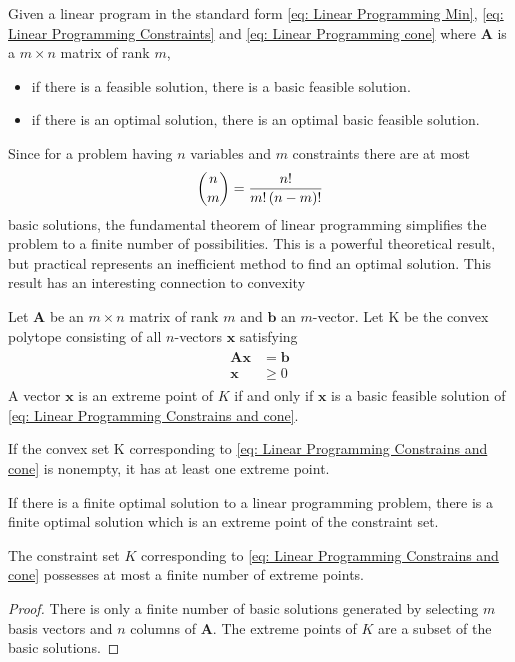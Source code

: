 \begin{theorem} Given a linear program in the standard form \eqref{eq: Linear Programming Min}, \eqref{eq: Linear Programming Constraints} and \eqref{eq: Linear Programming cone} where $\mathbf{A}$ is a $m\times n $ matrix of rank $m$,
	\begin{itemize}
		\item if there is a feasible solution, there is a basic feasible solution.
		\item if there is an optimal solution, there is an optimal basic feasible solution. 
	\end{itemize}
\end{theorem}
Since for a problem having $n$ variables and $m$ constraints there are at most
\begin{equation*}
	\binom{n}{m}=\frac{n!}{m!\left( n-m \right)!}
\end{equation*}
basic solutions, the fundamental theorem of linear programming simplifies the problem to a finite number of possibilities. This is a  powerful theoretical result, but practical represents an inefficient method to find an optimal solution. This result has an interesting connection to convexity 

\begin{theorem}
	Let $\mathbf{A}$ be an $m\times n$ matrix of rank $m$ and $\mathbf{b}$ an $m$-vector. Let K be the convex polytope consisting of all $n$-vectors $\mathbf{x}$ satisfying
	\begin{align}
		\begin{array}{cc}
		\mathbf{A}\mathbf{x}&=\mathbf{b} \\
		\mathbf{x}&\geq 0		
		\end{array}
	\label{eq: Linear Programming Constrains and cone}
	\end{align}
	A vector $\mathbf{x}$ is an extreme point of $K$ if and only if $\mathbf{x}$ is a basic feasible solution of \eqref{eq: Linear Programming Constrains and cone}.
\end{theorem}
\begin{corollary}
If the convex set K corresponding to \eqref{eq: Linear Programming Constrains and cone} is nonempty, it has at least one extreme point.
\end{corollary}
\begin{corollary}
If there is a finite optimal solution to a linear programming problem, there is a finite optimal solution which is an extreme point of the constraint set.
\end{corollary}
\begin{corollary}
The constraint set $K$ corresponding to \eqref{eq: Linear Programming Constrains and cone} possesses at most a finite number of extreme points.
	\begin{proof}
	There is only a finite number of basic solutions generated by selecting $m$ basis vectors and $n$ columns of $\mathbf{A}$. The extreme points of $K$ are a subset of the basic solutions.
	\end{proof}
\end{corollary}

